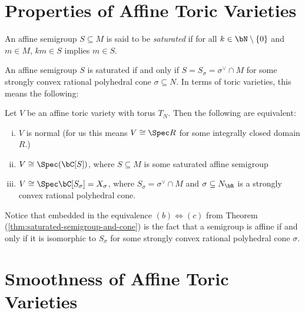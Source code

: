 \newpage

\section{Properties of Affine Toric Varieties}

\begin{defn}\label{defn:saturated-semigroup}
	An affine semigroup $S \subseteq M$ is said to be  \emph{saturated} if for all $k \in \bN \setminus \{0\}$ and $m \in M$, $km \in S$ implies $m \in S$.
\end{defn}
An affine semigroup $S$ is saturated if and only if $S = S_\sigma = \sigma^{\vee} \cap M$ for some strongly convex rational polyhedral cone $\sigma \subseteq N$. In terms of toric varieties, this means the following:
\begin{prop}\label{thm:saturated-semigroup-and-cone}
	Let $V$ be an affine toric variety with torus $T_N$. Then the following are equivalent:
	\begin{enumerate}[(i)]
	    \item $V$ is normal (for us this means $V \cong \Spec R$ for some integrally closed domain $R$.)
		\item $V \cong \Spec(\bC[S])$, where $S \subseteq M$ is some saturated affine semigroup
		\item $V \cong \Spec \bC[S_\sigma] = X_\sigma$, where $S_\sigma = \sigma^{\vee} \cap M$ and $\sigma \subseteq N_\bR$ is a strongly convex rational polyhedral cone.
	\end{enumerate}
\end{prop}
\begin{prf}
	
\end{prf}
Notice that embedded in the equivalence $(b) \iff (c)$ from Theorem (\ref{thm:saturated-semigroup-and-cone}) is the fact that a semigroup is affine if and only if it is isomorphic to $S_\sigma$ for some strongly convex rational polyhedral cone $\sigma$. 

\newpage

\section{Smoothness of Affine Toric Varieties}

